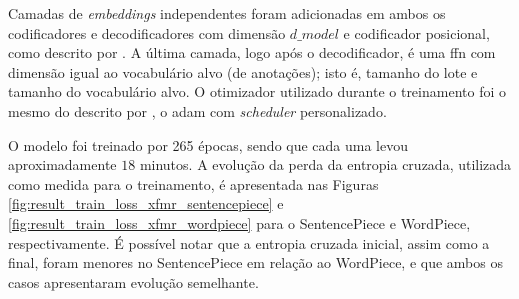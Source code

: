 Camadas de \textit{embeddings} independentes foram adicionadas em ambos os codificadores e decodificadores com dimensão $d\_model$ e codificador posicional, como descrito por \cite{Vaswani2017Attention}. A última camada, logo após o decodificador, é uma \gls{ffn} com dimensão igual ao vocabulário alvo (de anotações); isto é, tamanho do lote e tamanho do vocabulário alvo. O otimizador utilizado durante o treinamento foi o mesmo do descrito por \cite{Vaswani2017Attention}, o \gls{adam} com \textit{scheduler} personalizado.

O modelo foi treinado por 265 épocas, sendo que cada uma levou aproximadamente $18$ minutos. A evolução da perda da entropia cruzada, utilizada como medida para o treinamento, é apresentada nas Figuras \ref{fig:result_train_loss_xfmr_sentencepiece} e \ref{fig:result_train_loss_xfmr_wordpiece} para o SentencePiece e WordPiece, respectivamente. É possível notar que a entropia cruzada inicial, assim como a final, foram menores no SentencePiece em relação ao WordPiece, e que ambos os casos apresentaram evolução semelhante.
